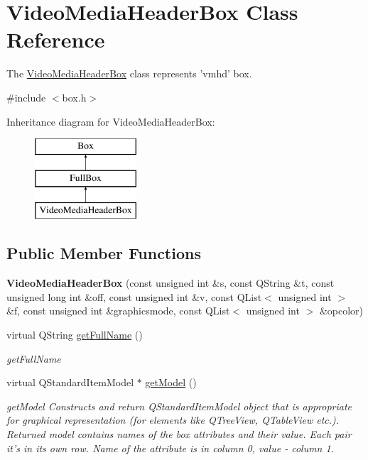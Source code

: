 \hypertarget{class_video_media_header_box}{\section{Video\-Media\-Header\-Box Class Reference}
\label{class_video_media_header_box}
}


The \hyperlink{class_video_media_header_box}{Video\-Media\-Header\-Box} class represents 'vmhd' box.  




{\ttfamily \#include $<$box.\-h$>$}

Inheritance diagram for Video\-Media\-Header\-Box\-:\begin{figure}[H]
\begin{center}
\leavevmode
\includegraphics[height=3.000000cm]{class_video_media_header_box}
\end{center}
\end{figure}
\subsection*{Public Member Functions}
\begin{DoxyCompactItemize}
\item 
\hypertarget{class_video_media_header_box_a2063e6554cfbfae70f34f1f7cadf488b}{{\bfseries Video\-Media\-Header\-Box} (const unsigned int \&s, const Q\-String \&t, const unsigned long int \&off, const unsigned int \&v, const Q\-List$<$ unsigned int $>$ \&f, const unsigned int \&graphicsmode, const Q\-List$<$ unsigned int $>$ \&opcolor)}\label{class_video_media_header_box_a2063e6554cfbfae70f34f1f7cadf488b}

\item 
virtual Q\-String \hyperlink{class_video_media_header_box_a6a6b15f956a608c18112b1b2b2317528}{get\-Full\-Name} ()
\begin{DoxyCompactList}\small\item\em get\-Full\-Name \end{DoxyCompactList}\item 
virtual Q\-Standard\-Item\-Model $\ast$ \hyperlink{class_video_media_header_box_aae14c3d53a5795039e3c5ccebc91d501}{get\-Model} ()
\begin{DoxyCompactList}\small\item\em get\-Model Constructs and return Q\-Standard\-Item\-Model object that is appropriate for graphical representation (for elements like Q\-Tree\-View, Q\-Table\-View etc.). Returned model contains names of the box attributes and their value. Each pair it's in its own row. Name of the attribute is in column 0, value -\/ column 1. \end{DoxyCompactList}\end{DoxyCompactItemize}
